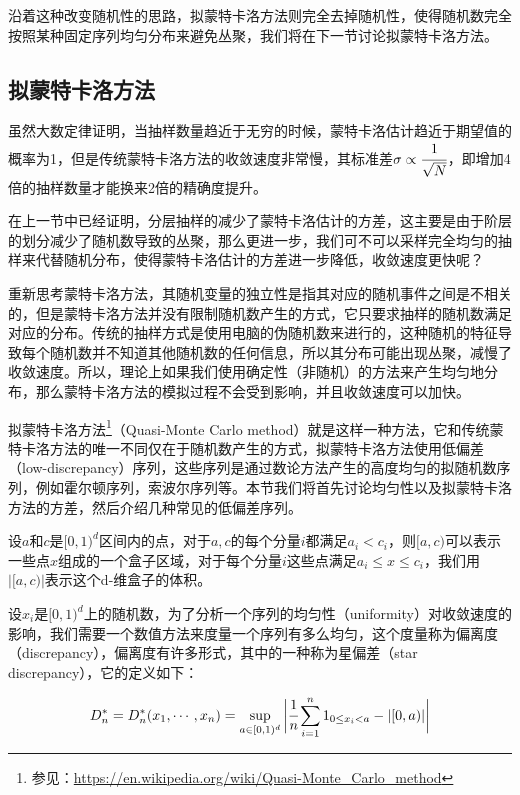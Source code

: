 沿着这种改变随机性的思路，拟蒙特卡洛方法则完全去掉随机性，使得随机数完全按照某种固定序列均匀分布来避免丛聚，我们将在下一节讨论拟蒙特卡洛方法。







\subsection{拟蒙特卡洛方法}\label{sec:quasi-monte-carlo}
虽然大数定律证明，当抽样数量趋近于无穷的时候，蒙特卡洛估计趋近于期望值的概率为1，但是传统蒙特卡洛方法的收敛速度非常慢，其标准差$\sigma\propto \cfrac{1}{\sqrt{N}}$，即增加4倍的抽样数量才能换来2倍的精确度提升。

在上一节中已经证明，分层抽样的减少了蒙特卡洛估计的方差，这主要是由于阶层的划分减少了随机数导致的丛聚，那么更进一步，我们可不可以采样完全均匀的抽样来代替随机分布，使得蒙特卡洛估计的方差进一步降低，收敛速度更快呢？

重新思考蒙特卡洛方法，其随机变量的独立性是指其对应的随机事件之间是不相关的，但是蒙特卡洛方法并没有限制随机数产生的方式，它只要求抽样的随机数满足对应的分布。传统的抽样方式是使用电脑的伪随机数来进行的，这种随机的特征导致每个随机数并不知道其他随机数的任何信息，所以其分布可能出现丛聚，减慢了收敛速度。所以，理论上如果我们使用确定性（非随机）的方法来产生均匀地分布，那么蒙特卡洛方法的模拟过程不会受到影响，并且收敛速度可以加快。

拟蒙特卡洛方法\footnote{参见：\url{https://en.wikipedia.org/wiki/Quasi-Monte_Carlo_method}}（Quasi-Monte Carlo method）就是这样一种方法，它和传统蒙特卡洛方法的唯一不同仅在于随机数产生的方式，拟蒙特卡洛方法使用低偏差（low-discrepancy）序列，这些序列是通过数论方法产生的高度均匀的拟随机数序列，例如霍尔顿序列，索波尔序列等。本节我们将首先讨论均匀性以及拟蒙特卡洛方法的方差，然后介绍几种常见的低偏差序列。

设$a$和$c$是$[0,1)^d$区间内的点，对于$a,c$的每个分量$i$都满足$a_i<c_i$，则$[a,c)$可以表示一些点$x$组成的一个盒子区域，对于每个分量$i$这些点满足$a_i\leq x\leq c_i$，我们用$|[a,c)|$表示这个d-维盒子的体积。

设$x_i$是$[0,1)^d$上的随机数，为了分析一个序列的均匀性（uniformity）对收敛速度的影响，我们需要一个数值方法来度量一个序列有多么均匀，这个度量称为偏离度（discrepancy），偏离度有许多形式，其中的一种称为星偏差（star discrepancy），它的定义如下：

\begin{equation}
	D^{*}_n=D^{*}_n(x_1,\cdots,x_n)=\sup_{a\in[0,1)^d}\bigg| \cfrac{1}{n}\sum^{n}_{i=1}1_{0\leq x_i<a}-|[0,a)|\bigg|
\end{equation}

